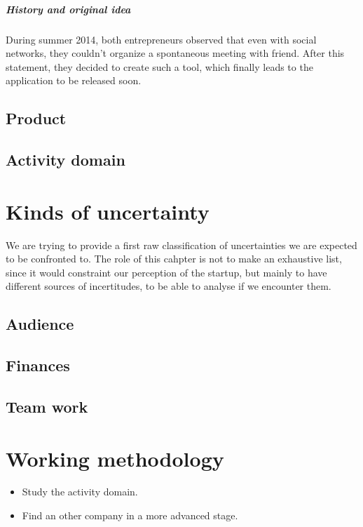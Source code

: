 \documentclass[twoside]{report}
\begin{document}
\paragraph{History and original idea}
During summer 2014, both entrepreneurs observed that even with social networks, they couldn't organize a spontaneous meeting with friend. After this statement, they decided to create such a tool, which finally leads to the application to be released soon.
\section{Product}
\section{Activity domain}







\chapter{Kinds of uncertainty}
We are trying to provide a first raw classification of uncertainties we are expected to be confronted to. The role of this cahpter is not to make an exhaustive list, since it would constraint our perception of the startup, but mainly to have different sources of incertitudes, to be able to analyse if we encounter them.
\section{Audience}
\section{Finances}
\section{Team work}







\chapter{Working methodology}
\begin{itemize}
	\item Study the activity domain.
	\item Find an other company in a more advanced stage.
\end{itemize}
\end{document}
